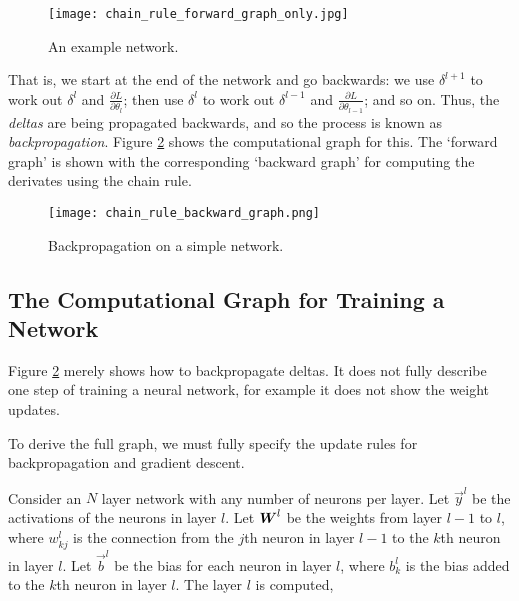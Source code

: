 \begin{figure}[t]
    \centering
    \texttt{[image: chain\_rule\_forward\_graph\_only.jpg]}
    \caption{An example network.}
    \label{fig:2-nn-chain-rule-forward}
\end{figure}

That is, we start at the end of the network and go backwards:
we use \(\delta^{l+1}\) to work out \(\delta^l\) and \(\frac{\partial L}{\partial \theta_l}\);
then use \(\delta^l\) to work out \(\delta^{l-1}\) and \(\frac{\partial L}{\partial \theta_{l-1}}\); and so on.
Thus, the \textit{deltas} are being propagated backwards, and so the process is known as \textit{backpropagation}.
Figure \ref{fig:2-nn-chain-rule-backward} shows the computational graph for this.
The `forward graph' is shown with the corresponding `backward graph' for computing the derivates using the chain rule.

\begin{figure}[htb]
    \centering
    \texttt{[image: chain\_rule\_backward\_graph.png]}
    \caption{Backpropagation on a simple network.}
    \label{fig:2-nn-chain-rule-backward}
\end{figure}


\subsection{The Computational Graph for Training a Network}

Figure \ref{fig:2-nn-chain-rule-backward} merely shows how to backpropagate deltas.
It does not fully describe one step of training a neural network, for example it does not show the weight updates.

To derive the full graph, we must fully specify the update rules for backpropagation and gradient descent.


Consider an \(N\) layer network with any number of neurons per layer.
Let \(\vec{y}^l\) be the activations of the neurons in layer \(l\).
Let \({\boldsymbol{{W}}}^l\) be the weights from layer \(l-1\) to \(l\), where \(w^l_{kj}\) is the connection from the \(j\)th neuron in layer \(l-1\) to the \(k\)th neuron in layer \(l\).
Let \(\vec{b}^l\) be the bias for each neuron in layer \(l\), where \(b^l_k\) is the bias added to the \(k\)th neuron in layer \(l\). The layer \(l\) is computed,

